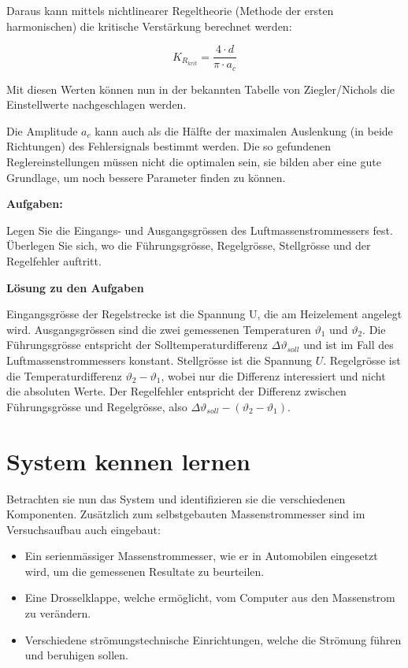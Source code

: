 \documentclass[a4paper,10pt,oneside]{article}
\begin{document}
Daraus kann mittels nichtlinearer Regeltheorie (Methode der ersten harmonischen) die kritische Verstärkung berechnet werden:

\begin{equation}
K_{R_{krit}}=\frac{4\cdot d}{\pi \cdot a_c}
\end{equation}

Mit diesen Werten können nun in der bekannten Tabelle von Ziegler/Nichols die Einstellwerte nachgeschlagen werden.

Die Amplitude $a_c$ kann auch als die Hälfte der maximalen Auslenkung (in beide Richtungen) des Fehlersignals bestimmt werden.
Die so gefundenen Reglereinstellungen müssen nicht die optimalen sein, sie bilden aber eine gute Grundlage, um noch bessere Parameter finden zu können.

\textbf{Aufgaben:}

Legen Sie die Eingangs- und Ausgangsgrössen des Luftmassenstrommessers fest. Überlegen Sie sich, wo die Führungsgrösse, Regelgrösse, Stellgrösse und der Regelfehler auftritt.


\textbf{Lösung zu den Aufgaben} 

Eingangsgrösse der Regelstrecke ist die Spannung U, die am Heizelement angelegt wird. Ausgangsgrössen sind die zwei gemessenen Temperaturen $\vartheta_1$ und $\vartheta_2$. Die Führungsgrösse entspricht der Solltemperaturdifferenz $\Delta\vartheta_{soll}$ und ist im Fall des Luftmassenstrommessers konstant. Stellgrösse ist die Spannung $U$. Regelgrösse ist die Temperaturdifferenz $\vartheta_2-\vartheta_1$, wobei nur die Differenz interessiert und nicht die absoluten Werte. Der Regelfehler entspricht der Differenz zwischen Führungsgrösse und Regelgrösse, also $\Delta\vartheta_{soll}-(\vartheta_2-\vartheta_1 )$.

\newpage


\section{System kennen lernen}

Betrachten sie nun das System und identifizieren sie die verschiedenen Komponenten. Zusätzlich zum selbstgebauten Massenstrommesser sind im Versuchsaufbau auch eingebaut:
\begin{itemize}
\item Ein serienmässiger Massenstrommesser, wie er in Automobilen eingesetzt wird, um die gemessenen Resultate zu beurteilen.
\item Eine Drosselklappe, welche ermöglicht, vom Computer aus den Massenstrom zu verändern.
\item Verschiedene strömungstechnische Einrichtungen, welche die Strömung führen und beruhigen sollen.
\end{itemize}
\end{document}
